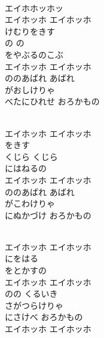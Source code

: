 \documentclass[10pt,b5j]{tarticle} %
\begin{document}
\vspace{1.5em} %
\newcommand{\linespace}{0.5em} %
\newcommand{\blocksize}{0.5\hsize} %
\newcommand{\itemmargin}{6em} %
\begin{enumerate} %
    \setlength{\itemindent}{\itemmargin} %
    \begin{minipage}[c]{\blocksize}
    
        \vspace{\linespace}
        \item~\\
        エイホホッホッ\\
        エイホッホ エイホッホ\\
        けむりをきす\\
        の の\\
        をやぶるのこぶ\\
        エイホッホ エイホッホ\\
        ののあばれ あばれ\\
        がおしけりゃ\\
        べたにひれせ おろかもの
        
        \vspace{\linespace}
        \item~\\
        エイホッホ エイホッホ\\
        をきす\\
        くじら くじら\\
        にはねるの\\
        エイホッホ エイホッホ\\
        ののあばれ あばれ\\
        がこわけりゃ\\
        にぬかづけ おろかもの
        
        \vspace{\linespace}
        \item~\\
        エイホッホ エイホッホ\\
        にをはる \\
        をとかすの\\
        エイホッホ エイホッホ\\
        のの くるいき\\
        さがつらけりゃ\\
        にさけべ おろかもの\\
        エイホッホ エイホッホ
    

\end{minipage}
\end{enumerate}
\end{document}
